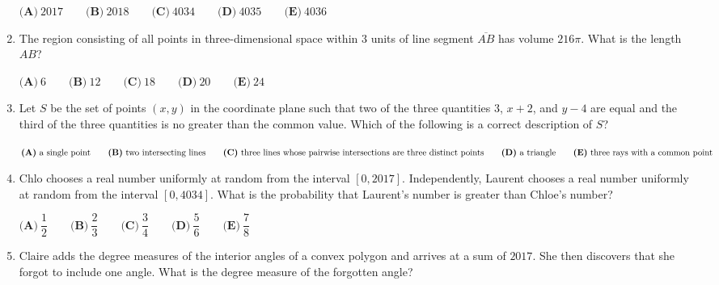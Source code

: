 \documentclass{article}
\begin{document}
\begin{enumerate}[label=\arabic*., itemsep=0.5em]
\( \textbf{(A)}\ 2017 \qquad\textbf{(B)}\ 2018 \qquad\textbf{(C)}\ 4034 \qquad\textbf{(D)}\ 4035 \qquad\textbf{(E)}\ 4036\)\par \vspace{0.5em}\item The region consisting of all points in three-dimensional space within \(3\) units of line segment \(\overline{AB}\) has volume \(216 \pi\). What is the length \(AB\)?

\( \textbf{(A)}\ 6 \qquad\textbf{(B)}\ 12 \qquad\textbf{(C)}\ 18 \qquad\textbf{(D)}\ 20 \qquad\textbf{(E)}\ 24\)\par \vspace{0.5em}\item Let \(S\) be the set of points \((x,y)\) in the coordinate plane such that two of the three quantities \(3\), \(x+2\), and \(y-4\) are equal and the third of the three quantities is no greater than the common value. Which of the following is a correct description of \(S\)?

\( \textbf{(A)}\ \text{a single point} \qquad\textbf{(B)}\ \text{two intersecting lines} \\ \qquad\textbf{(C)}\ \text{three lines whose pairwise intersections are three distinct points} \\ \qquad\textbf{(D)}\ \text{a triangle}\qquad\textbf{(E)}\ \text{three rays with a common point} \)\par \vspace{0.5em}\item Chlo chooses a real number uniformly at random from the interval \( [ 0,2017 ]\). Independently, Laurent chooses a real number uniformly at random from the interval \([ 0 , 4034 ]\). What is the probability that Laurent's number is greater than Chloe's number?  

\( \textbf{(A)}\ \dfrac{1}{2} \qquad\textbf{(B)}\ \dfrac{2}{3} \qquad\textbf{(C)}\ \dfrac{3}{4} \qquad\textbf{(D)}\ \dfrac{5}{6} \qquad\textbf{(E)}\ \dfrac{7}{8} \)\par \vspace{0.5em}\item Claire adds the degree measures of the interior angles of a convex polygon and arrives at a sum of \(2017\). She then discovers that she forgot to include one angle. What is the degree measure of the forgotten angle?


\end{enumerate}
\end{document}
